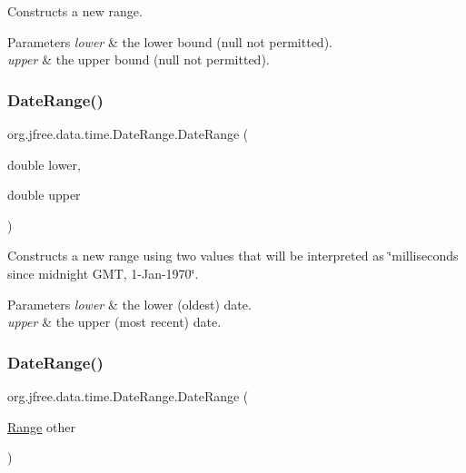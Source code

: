 Constructs a new range.


\begin{DoxyParams}{Parameters}
{\em lower} & the lower bound ({\ttfamily null} not permitted). \\
\hline
{\em upper} & the upper bound ({\ttfamily null} not permitted). \\
\hline
\end{DoxyParams}
\mbox{\label{classorg_1_1jfree_1_1data_1_1time_1_1_date_range_a00c28e49796a187e21661228eb0a1e4e}} 
\subsubsection{\texorpdfstring{Date\+Range()}{DateRange()}\hspace{0.1cm}{\footnotesize\ttfamily [3/4]}}
{\footnotesize\ttfamily org.\+jfree.\+data.\+time.\+Date\+Range.\+Date\+Range (\begin{DoxyParamCaption}\item[{double}]{lower,  }\item[{double}]{upper }\end{DoxyParamCaption})}

Constructs a new range using two values that will be interpreted as \char`\"{}milliseconds since midnight G\+M\+T, 1-\/\+Jan-\/1970\char`\"{}.


\begin{DoxyParams}{Parameters}
{\em lower} & the lower (oldest) date. \\
\hline
{\em upper} & the upper (most recent) date. \\
\hline
\end{DoxyParams}
\mbox{\label{classorg_1_1jfree_1_1data_1_1time_1_1_date_range_ad7605619fcbc2ef82511778604611baa}} 
\subsubsection{\texorpdfstring{Date\+Range()}{DateRange()}\hspace{0.1cm}{\footnotesize\ttfamily [4/4]}}
{\footnotesize\ttfamily org.\+jfree.\+data.\+time.\+Date\+Range.\+Date\+Range (\begin{DoxyParamCaption}\item[{\mbox{\hyperlink{classorg_1_1jfree_1_1data_1_1_range}{Range}}}]{other }\end{DoxyParamCaption})}


